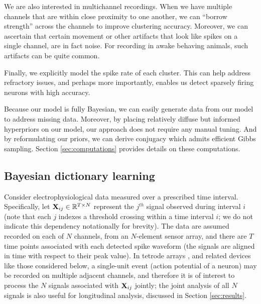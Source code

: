 \documentclass[journal]{IEEEtran}
\begin{document}
We are also interested in multichannel recordings.  When we have multiple channels that are within close proximity to one another, we can ``borrow strength'' across the channels to improve clustering accuracy.  Moreover, we can ascertain that certain movement or other artifacts that look like spikes on a single channel, are in fact noise.  For recording in awake behaving animals, such artifacts can be quite common. 

Finally, we explicitly model the spike rate of each cluster.  This can help address refractory issues, and perhaps more importantly, enables us detect sparsely firing neurons with high accuracy.

Because our model is fully Bayesian, we can easily generate data from our model to address missing data.  Moreover, by placing relatively diffuse but informed hyperpriors on our model, our approach does not require any manual tuning. And by reformulating our priors, we can derive conjugacy which admits efficient Gibbs sampling.  Section \ref{sec:computations} provides details on these computations.







\subsection{Bayesian dictionary learning\label{sec:dict}}

Consider electrophysiological data measured over a prescribed time interval. Specifically, let ${\mathbf X}_{ij}\in\mathbb{R}^{T\times N}$ represent the $j${$^{th}$} signal observed during interval $i$ {(note that each $j$ indexes a threshold crossing within a time interval $i$; we do not indicate this dependency notationally for brevity)}. The data are assumed recorded on each of $N$ channels, from an $N$-element sensor array, and there are $T$ time points associated with each detected spike waveform (the signals are aligned in time with respect to their peak value). In tetrode arrays \cite{tetrode}, and related devices like those considered below, a single-unit event (action potential of a neuron) may be recorded on multiple adjacent channels, and therefore it is of interest to process the $N$ signals associated with ${\mathbf X}_{ij}$ jointly; the joint analysis of all $N$ signals is also useful for {longitudinal analysis}, discussed in Section \ref{sec:results}.
\end{document}
